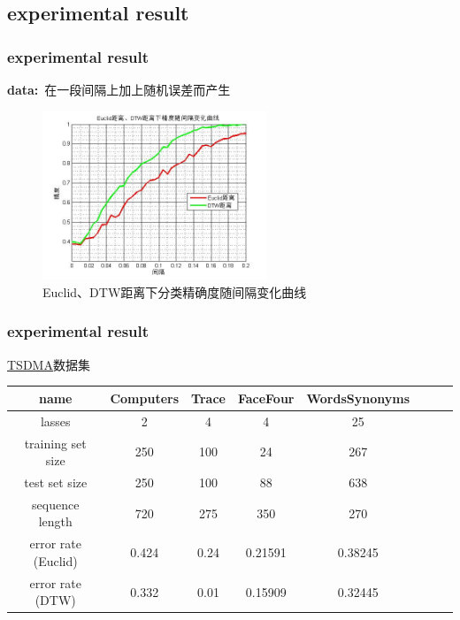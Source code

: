 \documentclass[xetex,mathserif,serif]{beamer}
\begin{document}
\subsection{experimental result}

\begin{frame}
\frametitle{experimental result}
\textbf{data:}\ 在一段间隔上加上随机误差而产生
\begin{figure}
  \centering
  \includegraphics[width=0.6\textwidth]{interval.jpg}
  \caption{Euclid、DTW距离下分类精确度随间隔变化曲线}\label{fig:8}
\end{figure}
\end{frame}

\begin{frame}
\small
\frametitle{experimental result}
\href{http://www.cs.ucr.edu/~eamonn/time_series_data/}{TSDMA}数据集
    \begin{center}
      \begin{tabular}{|c|c|c|c|c|c|c|c|}
      \hline
      name & Computers & Trace & FaceFour & WordsSynonyms\\
      \hline
      lasses & 2 & 4 & 4 & 25  \\
      \hline
      training set size & 250 & 100 & 24 & 267  \\
      \hline
      test set size & 250 & 100 & 88 & 638  \\
      \hline
      sequence length & 720 & 275 & 350 & 270  \\
      \hline
      error rate (Euclid) & 0.424 & 0.24 & 0.21591 & 0.38245 \\
      \hline
      error rate (DTW) & 0.332 & 0.01 & 0.15909 & 0.32445  \\
      \hline
    \end{tabular}
    \end{center}
\end{frame}
\end{document}
